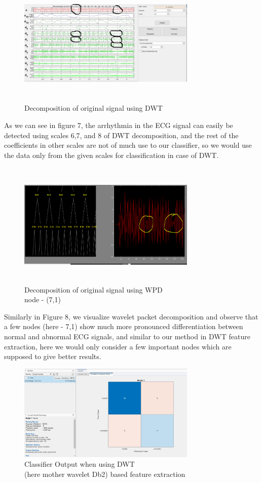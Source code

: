 \documentclass[10pt,twocolumn,letterpaper]{article}
\begin{document}
\begin{figure}[h!]
\includegraphics[width=8.5cm, height=6cm]{DWT_example.png}
\caption{Decomposition of original signal using DWT}
\label{DWT Simulation}
\end{figure}
As we can see in figure 7, the arrhythmia in the ECG signal can easily be detected using scales 6,7, and 8 of DWT decomposition, and the rest of the coefficients in other scales are not of much use to our classifier, so we would use the data only from the given scales for classification in case of DWT.\\
\begin{figure}[h!]
\includegraphics[width=8.5cm, height=6cm]{WPD_example.png}
\caption{Decomposition of original signal using WPD \\ node - (7,1)}
\label{WPD Simulation}
\end{figure}
Similarly in Figure 8, we visualize wavelet packet decomposition and observe that a few nodes (here - 7,1) show much more pronounced differentiation between normal and abnormal ECG signals, and similar to our method in DWT feature extraction, here we would only consider a few important nodes which are supposed to give better results.\\
\begin{figure}[h!]
\includegraphics[width=8.5cm]{DWT_result_db2.jpg}
\caption{Classifier Output when using DWT \\ (here mother wavelet Db2) based feature extraction}
\label{DWT Simulation}
\end{figure}
\end{document}
